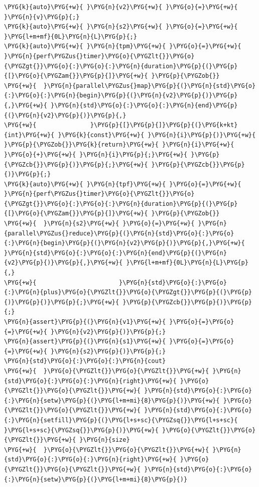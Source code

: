 \begin{codeblockbg}
\begin{Verbatim}[commandchars=\\\{\},breaklines=true,breakanywhere=true,fontsize=\codefont,xleftmargin=17bp]
\PYG{k}{auto}\PYG{+w}{ }\PYG{n}{v2}\PYG{+w}{ }\PYG{o}{=}\PYG{+w}{ }\PYG{n}{v}\PYG{p}{;}
\PYG{k}{auto}\PYG{+w}{ }\PYG{n}{s2}\PYG{+w}{ }\PYG{o}{=}\PYG{+w}{ }\PYG{l+m+mf}{0L}\PYG{n}{L}\PYG{p}{;}
\PYG{k}{auto}\PYG{+w}{ }\PYG{n}{tpm}\PYG{+w}{ }\PYG{o}{=}\PYG{+w}{ }\PYG{n}{perf\PYGZus{}timer}\PYG{o}{\PYGZlt{}}\PYG{o}{\PYGZgt{}}\PYG{o}{:}\PYG{o}{:}\PYG{n}{duration}\PYG{p}{(}\PYG{p}{[}\PYG{o}{\PYGZam{}}\PYG{p}{]}\PYG{+w}{ }\PYG{p}{\PYGZob{}}
\PYG{+w}{  }\PYG{n}{parallel\PYGZus{}map}\PYG{p}{(}\PYG{n}{std}\PYG{o}{:}\PYG{o}{:}\PYG{n}{begin}\PYG{p}{(}\PYG{n}{v2}\PYG{p}{)}\PYG{p}{,}\PYG{+w}{ }\PYG{n}{std}\PYG{o}{:}\PYG{o}{:}\PYG{n}{end}\PYG{p}{(}\PYG{n}{v2}\PYG{p}{)}\PYG{p}{,}
\PYG{+w}{               }\PYG{p}{[}\PYG{p}{]}\PYG{p}{(}\PYG{k+kt}{int}\PYG{+w}{ }\PYG{k}{const}\PYG{+w}{ }\PYG{n}{i}\PYG{p}{)}\PYG{+w}{ }\PYG{p}{\PYGZob{}}\PYG{k}{return}\PYG{+w}{ }\PYG{n}{i}\PYG{+w}{ }\PYG{o}{+}\PYG{+w}{ }\PYG{n}{i}\PYG{p}{;}\PYG{+w}{ }\PYG{p}{\PYGZcb{}}\PYG{p}{)}\PYG{p}{;}\PYG{+w}{ }\PYG{p}{\PYGZcb{}}\PYG{p}{)}\PYG{p}{;}
\PYG{k}{auto}\PYG{+w}{ }\PYG{n}{tpf}\PYG{+w}{ }\PYG{o}{=}\PYG{+w}{ }\PYG{n}{perf\PYGZus{}timer}\PYG{o}{\PYGZlt{}}\PYG{o}{\PYGZgt{}}\PYG{o}{:}\PYG{o}{:}\PYG{n}{duration}\PYG{p}{(}\PYG{p}{[}\PYG{o}{\PYGZam{}}\PYG{p}{]}\PYG{+w}{ }\PYG{p}{\PYGZob{}}
\PYG{+w}{  }\PYG{n}{s2}\PYG{+w}{ }\PYG{o}{=}\PYG{+w}{ }\PYG{n}{parallel\PYGZus{}reduce}\PYG{p}{(}\PYG{n}{std}\PYG{o}{:}\PYG{o}{:}\PYG{n}{begin}\PYG{p}{(}\PYG{n}{v2}\PYG{p}{)}\PYG{p}{,}\PYG{+w}{ }\PYG{n}{std}\PYG{o}{:}\PYG{o}{:}\PYG{n}{end}\PYG{p}{(}\PYG{n}{v2}\PYG{p}{)}\PYG{p}{,}\PYG{+w}{ }\PYG{l+m+mf}{0L}\PYG{n}{L}\PYG{p}{,}
\PYG{+w}{                       }\PYG{n}{std}\PYG{o}{:}\PYG{o}{:}\PYG{n}{plus}\PYG{o}{\PYGZlt{}}\PYG{o}{\PYGZgt{}}\PYG{p}{(}\PYG{p}{)}\PYG{p}{)}\PYG{p}{;}\PYG{+w}{ }\PYG{p}{\PYGZcb{}}\PYG{p}{)}\PYG{p}{;}
\PYG{n}{assert}\PYG{p}{(}\PYG{n}{v1}\PYG{+w}{ }\PYG{o}{=}\PYG{o}{=}\PYG{+w}{ }\PYG{n}{v2}\PYG{p}{)}\PYG{p}{;}
\PYG{n}{assert}\PYG{p}{(}\PYG{n}{s1}\PYG{+w}{ }\PYG{o}{=}\PYG{o}{=}\PYG{+w}{ }\PYG{n}{s2}\PYG{p}{)}\PYG{p}{;}
\PYG{n}{std}\PYG{o}{:}\PYG{o}{:}\PYG{n}{cout}
\PYG{+w}{  }\PYG{o}{\PYGZlt{}}\PYG{o}{\PYGZlt{}}\PYG{+w}{ }\PYG{n}{std}\PYG{o}{:}\PYG{o}{:}\PYG{n}{right}\PYG{+w}{ }\PYG{o}{\PYGZlt{}}\PYG{o}{\PYGZlt{}}\PYG{+w}{ }\PYG{n}{std}\PYG{o}{:}\PYG{o}{:}\PYG{n}{setw}\PYG{p}{(}\PYG{l+m+mi}{8}\PYG{p}{)}\PYG{+w}{ }\PYG{o}{\PYGZlt{}}\PYG{o}{\PYGZlt{}}\PYG{+w}{ }\PYG{n}{std}\PYG{o}{:}\PYG{o}{:}\PYG{n}{setfill}\PYG{p}{(}\PYG{l+s+sc}{\PYGZsq{}}\PYG{l+s+sc}{ }\PYG{l+s+sc}{\PYGZsq{}}\PYG{p}{)}\PYG{+w}{ }\PYG{o}{\PYGZlt{}}\PYG{o}{\PYGZlt{}}\PYG{+w}{ }\PYG{n}{size}
\PYG{+w}{  }\PYG{o}{\PYGZlt{}}\PYG{o}{\PYGZlt{}}\PYG{+w}{ }\PYG{n}{std}\PYG{o}{:}\PYG{o}{:}\PYG{n}{right}\PYG{+w}{ }\PYG{o}{\PYGZlt{}}\PYG{o}{\PYGZlt{}}\PYG{+w}{ }\PYG{n}{std}\PYG{o}{:}\PYG{o}{:}\PYG{n}{setw}\PYG{p}{(}\PYG{l+m+mi}{8}\PYG{p}{)}

\end{Verbatim}
\end{codeblockbg}
